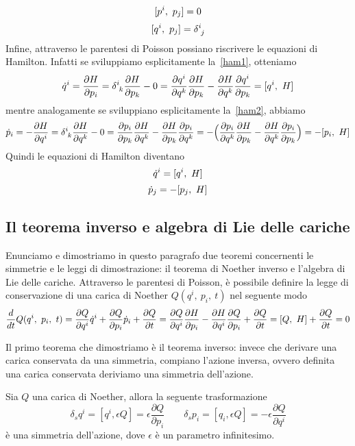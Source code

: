     \begin{equation*}
        [p^i, ~p_j] = 0
    \end{equation*}
    \begin{equation} \label{canqq}
        \poi{q^i}{p_j} = \delta^i_{\phantom i j}
    \end{equation}
    Infine, attraverso le parentesi di Poisson possiano riscrivere le equazioni di Hamilton. Infatti se sviluppiamo esplicitamente la~\eqref{ham1}, otteniamo 
    \begin{equation*}
        \dot q^i = \pdv{H}{p_i} = \delta^i_{\phantom i k} \pdv{H}{p_k} - 0 = \pdv{q^i}{q^k} \pdv{H}{p_k} - \pdv{H}{q^k} \pdv{q^i}{p_k} = \poi{q^i}{H}
    \end{equation*}
    mentre analogamente se sviluppiano esplicitamente la~\eqref{ham2}, abbiamo
    \begin{equation*}
        \dot p_i = - \pdv{H}{q^i} = \delta^i_{\phantom i k} \pdv{H}{q^k} - 0 = \pdv{p_i}{p_k} \pdv{H}{q^k} - \pdv{H}{p_k} \pdv{p_i}{q^k} = - \Big( \pdv{p_i}{q^k} \pdv{H}{p_k} - \pdv{H}{q^k} \pdv{p_i}{p_k} \Big) = - \poi{p_i}{H}
    \end{equation*}
    Quindi le equazioni di Hamilton diventano 
    \begin{equation*}
        \dot q^i = [q^i, ~H]
    \end{equation*}
    \begin{equation*} 
        \dot p_j = - [p_j, ~H]
    \end{equation*}  

\subsection{Il teorema inverso e algebra di Lie delle cariche}

    Enunciamo e dimostriamo in questo paragrafo due teoremi concernenti le simmetrie e le leggi di dimostrazione: il teorema di Noether inverso e l'algebra di Lie delle cariche. Attraverso le parentesi di Poisson, è possibile definire la legge di conservazione di una carica di Noether $ Q(q^i, ~p_i, ~t)$ nel seguente modo
    \begin{equation} \label{caricaham}
        \frac{d}{dt} Q(q^i, ~p_i, ~t) = \frac{\partial Q}{\partial q^i} \dot q^i + \frac{\partial Q}{\partial p_i} \dot p_i + \frac{\partial Q}{\partial t} = \frac{\partial Q}{\partial q^i} \frac{\partial H}{\partial p_i} - \frac{\partial H}{\partial q^i} \frac{\partial Q}{\partial p_i} + \frac{\partial Q}{\partial t} = [Q, ~H] + \frac{\partial Q}{\partial t} = 0
    \end{equation}

    Il primo teorema che dimostriamo è il teorema inverso: invece che derivare una carica conservata da una simmetria, compiano l'azione inversa, ovvero definita una carica conservata deriviamo una simmetria dell'azione.
    \begin{theorem}
        Sia $Q$ una carica di Noether, allora la seguente trasformazione 
    \begin{equation*}
        \delta_s q^i = [q^i, \epsilon Q] = \epsilon \frac{\partial Q}{\partial p_i} \qquad \delta_s p_i = [q_i, \epsilon Q] = - \epsilon \frac{\partial Q}{\partial q^i}
    \end{equation*}
        è una simmetria dell'azione, dove $\epsilon$ è un parametro infinitesimo.
    \end{theorem}

